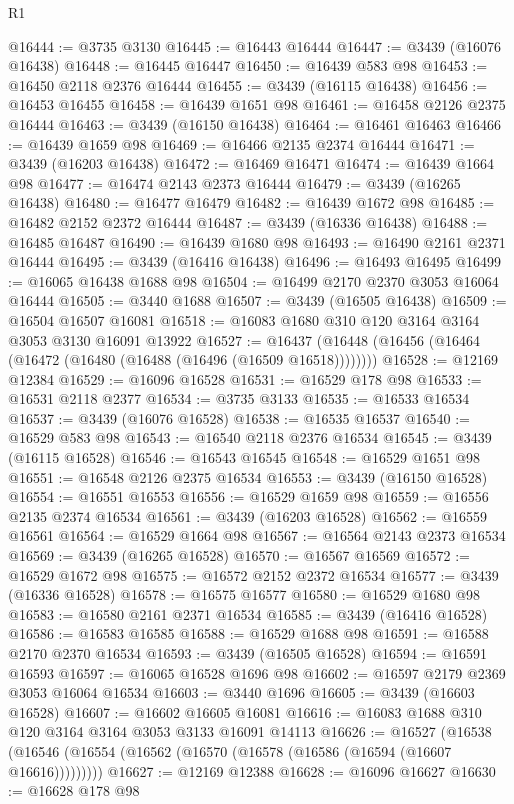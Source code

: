 \begin{lexlean}{R1}
\begin{coremodule}
@16444 := @3735 @3130
@16445 := @16443 @16444
@16447 := @3439 (@16076 @16438)
@16448 := @16445 @16447
@16450 := @16439 @583 @98
@16453 := @16450 @2118 @2376 @16444
@16455 := @3439 (@16115 @16438)
@16456 := @16453 @16455
@16458 := @16439 @1651 @98
@16461 := @16458 @2126 @2375 @16444
@16463 := @3439 (@16150 @16438)
@16464 := @16461 @16463
@16466 := @16439 @1659 @98
@16469 := @16466 @2135 @2374 @16444
@16471 := @3439 (@16203 @16438)
@16472 := @16469 @16471
@16474 := @16439 @1664 @98
@16477 := @16474 @2143 @2373 @16444
@16479 := @3439 (@16265 @16438)
@16480 := @16477 @16479
@16482 := @16439 @1672 @98
@16485 := @16482 @2152 @2372 @16444
@16487 := @3439 (@16336 @16438)
@16488 := @16485 @16487
@16490 := @16439 @1680 @98
@16493 := @16490 @2161 @2371 @16444
@16495 := @3439 (@16416 @16438)
@16496 := @16493 @16495
@16499 := @16065 @16438 @1688 @98
@16504 := @16499 @2170 @2370 @3053 @16064 @16444
@16505 := @3440 @1688
@16507 := @3439 (@16505 @16438)
@16509 := @16504 @16507 @16081
@16518 := @16083 @1680 @310 @120 @3164 @3164 @3053 @3130 @16091 @13922
@16527 := @16437 (@16448 (@16456 (@16464 (@16472 (@16480 (@16488 (@16496 (@16509 @16518))))))))
@16528 := @12169 @12384
@16529 := @16096 @16528
@16531 := @16529 @178 @98
@16533 := @16531 @2118 @2377
@16534 := @3735 @3133
@16535 := @16533 @16534
@16537 := @3439 (@16076 @16528)
@16538 := @16535 @16537
@16540 := @16529 @583 @98
@16543 := @16540 @2118 @2376 @16534
@16545 := @3439 (@16115 @16528)
@16546 := @16543 @16545
@16548 := @16529 @1651 @98
@16551 := @16548 @2126 @2375 @16534
@16553 := @3439 (@16150 @16528)
@16554 := @16551 @16553
@16556 := @16529 @1659 @98
@16559 := @16556 @2135 @2374 @16534
@16561 := @3439 (@16203 @16528)
@16562 := @16559 @16561
@16564 := @16529 @1664 @98
@16567 := @16564 @2143 @2373 @16534
@16569 := @3439 (@16265 @16528)
@16570 := @16567 @16569
@16572 := @16529 @1672 @98
@16575 := @16572 @2152 @2372 @16534
@16577 := @3439 (@16336 @16528)
@16578 := @16575 @16577
@16580 := @16529 @1680 @98
@16583 := @16580 @2161 @2371 @16534
@16585 := @3439 (@16416 @16528)
@16586 := @16583 @16585
@16588 := @16529 @1688 @98
@16591 := @16588 @2170 @2370 @16534
@16593 := @3439 (@16505 @16528)
@16594 := @16591 @16593
@16597 := @16065 @16528 @1696 @98
@16602 := @16597 @2179 @2369 @3053 @16064 @16534
@16603 := @3440 @1696
@16605 := @3439 (@16603 @16528)
@16607 := @16602 @16605 @16081
@16616 := @16083 @1688 @310 @120 @3164 @3164 @3053 @3133 @16091 @14113
@16626 := @16527
    (@16538 (@16546 (@16554 (@16562 (@16570 (@16578 (@16586 (@16594 (@16607 @16616)))))))))
@16627 := @12169 @12388
@16628 := @16096 @16627
@16630 := @16628 @178 @98

\end{coremodule}
\end{lexlean}
